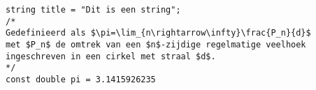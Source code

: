\begin{verbatim}
string title = "Dit is een string";
/*
Gedefinieerd als $\pi=\lim_{n\rightarrow\infty}\frac{P_n}{d}$
met $P_n$ de omtrek van een $n$-zijdige regelmatige veelhoek
ingeschreven in een cirkel met straal $d$.
*/
const double pi = 3.1415926235
\end{verbatim}
